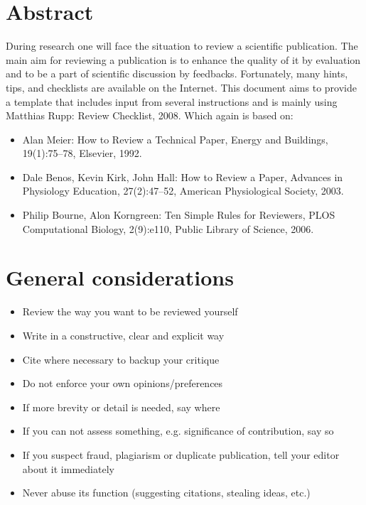 

\section*{Abstract}
During research one will face the situation to review a scientific publication. The main aim for reviewing a publication is to enhance the quality of it by evaluation and to be a  part of scientific discussion by feedbacks. 
Fortunately, many hints, tips, and checklists are available on the Internet.
This document aims to provide a template that includes input from several instructions and is mainly using Matthias Rupp: Review Checklist, 2008.
Which again is based on:
\begin{itemize}
    \item Alan Meier: How to Review a Technical Paper, Energy and Buildings, 19(1):75–78, Elsevier, 1992.
    \item Dale Benos, Kevin Kirk, John Hall: How to Review a Paper, Advances in Physiology Education, 27(2):47–52, American Physiological Society, 2003.
    \item Philip Bourne, Alon Korngreen: Ten Simple Rules for Reviewers, PLOS Computational Biology, 2(9):e110, Public Library of Science, 2006.
\end{itemize}

\section*{General considerations}
\begin{itemize}
    \item Review the way you want to be reviewed yourself
    \item Write in a constructive, clear and explicit way
    \item Cite where necessary to backup your critique
    \item Do not enforce your own opinions/preferences
    \item If more brevity or detail is needed, say where
    \item If you can not assess something, e.g. significance of contribution, say so
    \item If you suspect fraud, plagiarism or duplicate publication, tell your editor about it immediately
    \item Never abuse its function (suggesting citations, stealing ideas, etc.)
\end{itemize}

